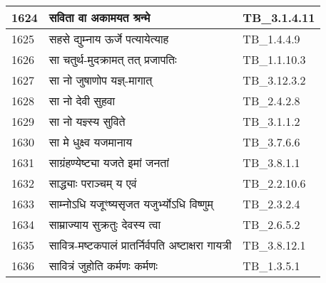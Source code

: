 \documentclass[17pt]{extarticle}
\begin{document}
\begin{longtable}{||p{0.4in}||p{4.9in}||p{0.9in}||}
    \hline
        
    1624 & सविता वा अकामयत श्रन्मे & TB\_3.1.4.11       \\
    
    \hline
        
    1625 & सहसे द्युम्नाय ऊर्जे पत्यायेत्याह & TB\_1.4.4.9       \\
    
    \hline
        
    1626 & सा चतुर्थ{-}मुदक्रामत् तत् प्रजापतिः & TB\_1.1.10.3       \\
    
    \hline
        
    1627 & सा नो जुषाणोप यज्ञ्{-}मागात् & TB\_3.12.3.2       \\
    
    \hline
        
    1628 & सा नो देवी सुहवा & TB\_2.4.2.8       \\
    
    \hline
        
    1629 & सा नो यज्ञ्स्य सुविते & TB\_3.1.1.2       \\
    
    \hline
        
    1630 & सा मे धुक्ष्व यजमानाय & TB\_3.7.6.6       \\
    
    \hline
        
    1631 & साग्रंहण्येष्ट्या यजते इमां जनतां & TB\_3.8.1.1       \\
    
    \hline
        
    1632 & साद्ध्याः पराञ्चम् य एवं & TB\_2.2.10.6       \\
    
    \hline
        
    1633 & साम्नोऽधि यजूꣳष्यसृजत यजुर्भ्योऽधि विष्णुम् & TB\_2.3.2.4       \\
    
    \hline
        
    1634 & साम्राज्याय सुक्रतुः देवस्य त्वा & TB\_2.6.5.2       \\
    
    \hline
        
    1635 & सावित्र{-}मष्टकपालं प्रातर्निर्वपति अष्टाक्षरा गायत्री & TB\_3.8.12.1       \\
    
    \hline
        
    1636 & सावित्रं जुहोति कर्मणः कर्मणः & TB\_1.3.5.1       \\
    

\end{longtable}
\end{document}
